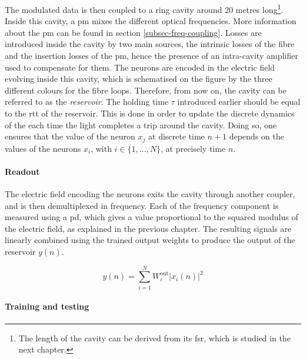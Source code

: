 The modulated data is then coupled to a ring cavity around 20 metres long\footnote{The length of the cavity can be derived from its \gls{fsr}, which is studied in the next chapter.}. Inside this cavity, a \gls{pm} mixes the different optical frequencies. More information about the \gls{pm} can be found in section \ref{subsec-freq-coupling}. Losses are introduced inside the cavity by two main sources, the intrinsic losses of the fibre and the insertion losses of the \gls{pm}, hence the presence of an intra-cavity amplifier used to compensate for them. The neurons are encoded in the electric field evolving inside this cavity, which is schematised on the figure by the three different colours for the fibre loops. Therefore, from now on, the cavity can be referred to as the \textit{reservoir}. The holding time $\tau$ introduced earlier should be equal to the \gls{rtt} of the reservoir. This is done in order to update the discrete dynamics of the \rcer each time the light completes a trip around the cavity. Doing so, one ensures that the value of the neuron $x_j$ at discrete time $n+1$ depends on the values of the neurons $x_i$, with $i \in \{1,\dots, N\}$, at precisely time $n$. 

\paragraph{Readout}

The electric field encoding the neurons exits the cavity through another coupler, and is then demultiplexed in frequency. Each of the frequency component is measured using a \gls{pd}, which gives a value proportional to the squared modulus of the electric field, as explained in the previous chapter. The resulting signals are linearly combined using the trained output weights to produce the output of the reservoir $y(n)$.

\begin{equation}
	y(n) = \sum_{i=1}^{N} W_i^{\text{out}} |x_i(n)|^2
\end{equation}

\paragraph{Training and testing}

